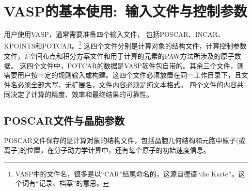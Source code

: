 \chapter{\rm{VASP}的基本使用:~输入文件与控制参数}
用户使用\textrm{VASP}，通常需要准备四个输入文件，%
包括\textrm{POSCAR}、\textrm{INCAR}、\textrm{KPOINTS}和\textrm{POTCAR}。\footnote{\textrm{VASP}中的文件名，很多是以\textrm{``CAR''}结尾命名的，这源自德语\textrm{``die Karte''}。这个词有``记录、档案''的意思。}
这四个文件分别是计算对象的结构文件，计算控制参数文件，$\vec k$空间布点和积分方案文件和用于计算的元素的\textrm{PAW}方法所涉及的原子数据。
这四个文件中，\textrm{POTCAR}的数据是\textrm{VASP}软件包自带的。其余三个文件，则需要用户按一定的规则输入或构建。这四个文件必须放置在同一工作目录下，且文件名必须全部大写、无扩展名，文件内容必须是纯文本格式。%
四个文件的内容共同决定了计算的精度、效率和最终结果的可靠性。


\section{\rm{POSCAR}文件与晶胞参数}
\textrm{POSCAR}文件保存的是计算对象的结构文件，包括晶胞几何结构和元胞中原子(或离子)的位置，在分子动力学计算中，还有每个原子的初始速度信息。
